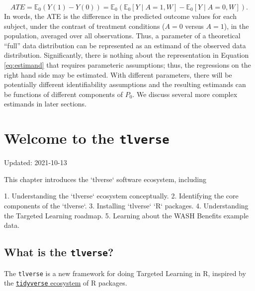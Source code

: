 \documentclass[
  12pt, krantz2,
]{krantz}
\newcommand{\passthrough}[1]{#1}
\theoremstyle{definition}
\theoremstyle{definition}
\theoremstyle{definition}
\newcommand{\E}{\mathbb{E}}
\newcommand{\1}{\mathbbm{1}}
\begin{document}
\begin{equation}
  ATE = \E_0(Y(1) - Y(0)) = \E_0
    \left(\E_0[Y \mid A = 1, W] - \E_0[Y \mid A = 0, W]\right).
  \label{eq:estimand}
\end{equation}
In words, the ATE is the difference in the predicted outcome values for each
subject, under the contrast of treatment conditions (\(A = 0\) versus \(A = 1\)),
in the population, averaged over all observations. Thus, a parameter of a
theoretical ``full'' data distribution can be represented as an estimand of the
observed data distribution. Significantly, there is nothing about the
representation in Equation \eqref{eq:estimand} that requires parameteric
assumptions; thus, the regressions on the right hand side may be estimated.
With different parameters, there will be potentially different identifiability
assumptions and the resulting estimands can be functions of different components
of \(P_0\). We discuss several more complex estimands in later sections.

\hypertarget{tlverse}{%
\chapter{\texorpdfstring{Welcome to the \texttt{tlverse}}{Welcome to the tlverse}}\label{tlverse}}

Updated: 2021-10-13

\begin{VT1}



This chapter introduces the `tlverse` software ecosystem, including

1. Understanding the `tlverse` ecosystem conceptually.
2. Identifying the core components of the `tlverse`.
3. Installing `tlverse` `R` packages.
4. Understanding the Targeted Learning roadmap.
5. Learning about the WASH Benefits example data.

\end{VT1}

\hypertarget{what-is-the-tlverse}{%
\section*{\texorpdfstring{What is the \texttt{tlverse}?}{What is the tlverse?}}\label{what-is-the-tlverse}}


The \passthrough{\lstinline!tlverse!} is a new framework for doing Targeted Learning in R, inspired by
the \href{https://tidyverse.org}{\passthrough{\lstinline!tidyverse!} ecosystem} of R packages.
\end{document}
